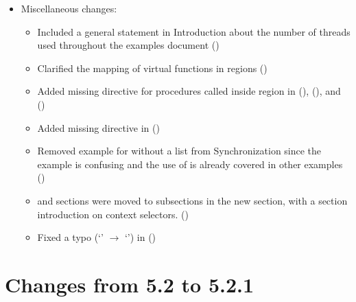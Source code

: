 \begin{itemize}
\item Miscellaneous changes:
\begin{itemize}
  \item Included a general statement in Introduction about the number of 
    threads used throughout the examples document ()
  \item Clarified the mapping of virtual functions in  regions
    ()
  \item Added missing  directive for procedures
    called inside  region in  
     (),
     (), 
    and 
    ()
  \item Added missing  directive in 
    ()
  \item Removed example for  without a list from Synchronization 
    since the example is confusing and the use of  is already
    covered in other examples
    ()
  \item {} and  sections were moved to
         subsections in the new  section, 
         with a section introduction on context selectors.
    ()
  \item Fixed a typo (`' $\rightarrow$ `') in 
    ()
\end{itemize}

\end{itemize}

\section{Changes from 5.2 to 5.2.1}
\label{sec:history_52_to_521}

